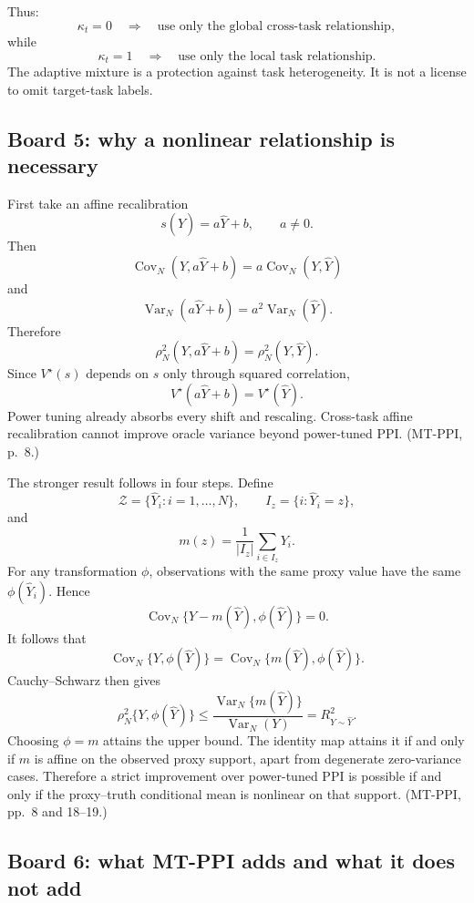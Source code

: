 \documentclass[11pt]{article}
\newcommand{\Var}{\operatorname{Var}}
\newcommand{\Cov}{\operatorname{Cov}}
\begin{document}
  Thus:
  \[
      \kappa_t=0
      \quad\Rightarrow\quad
      \text{use only the global cross-task relationship},
  \]
  while
  \[
      \kappa_t=1
      \quad\Rightarrow\quad
      \text{use only the local task relationship}.
  \]
  The adaptive mixture is a protection against task heterogeneity. It is not a
  license to omit target-task labels.
  
  \subsection*{Board 5: why a nonlinear relationship is necessary}
  
  First take an affine recalibration
  \[
      s(\widehat Y)=a\widehat Y+b,
      \qquad a\neq0.
  \]
  Then
  \[
      \Cov_N(Y,a\widehat Y+b)=a\Cov_N(Y,\widehat Y)
  \]
  and
  \[
      \Var_N(a\widehat Y+b)=a^2\Var_N(\widehat Y).
  \]
  Therefore
  \[
      \rho_N^2(Y,a\widehat Y+b)
      =
      \rho_N^2(Y,\widehat Y).
  \]
  Since \(V^\star(s)\) depends on \(s\) only through squared correlation,
  \[
      V^\star(a\widehat Y+b)=V^\star(\widehat Y).
  \]
  Power tuning already absorbs every shift and rescaling. Cross-task affine
  recalibration cannot improve oracle variance beyond power-tuned PPI.
  (MT-PPI, p.~8.)
  
  The stronger result follows in four steps. Define
  \[
      \mathcal Z=\{\widehat Y_i:i=1,\ldots,N\},
      \qquad
      I_z=\{i:\widehat Y_i=z\},
  \]
  and
  \[
      m(z)=\frac{1}{|I_z|}\sum_{i\in I_z}Y_i.
  \]
  For any transformation \(\phi\), observations with the same proxy value have
  the same \(\phi(\widehat Y_i)\). Hence
  \[
      \Cov_N\{Y-m(\widehat Y),\phi(\widehat Y)\}=0.
  \]
  It follows that
  \[
      \Cov_N\{Y,\phi(\widehat Y)\}
      =
      \Cov_N\{m(\widehat Y),\phi(\widehat Y)\}.
  \]
  Cauchy--Schwarz then gives
  \[
      \rho_N^2\{Y,\phi(\widehat Y)\}
      \leq
      \frac{\Var_N\{m(\widehat Y)\}}{\Var_N(Y)}
      =
      R_{Y\sim\widehat Y}^2.
  \]
  Choosing \(\phi=m\) attains the upper bound. The identity map attains it if
  and only if \(m\) is affine on the observed proxy support, apart from
  degenerate zero-variance cases. Therefore a strict improvement over
  power-tuned PPI is possible if and only if the proxy--truth conditional mean
  is nonlinear on that support. (MT-PPI, pp.~8 and 18--19.)
  
  \subsection*{Board 6: what MT-PPI adds and what it does not add}
  
\end{document}
